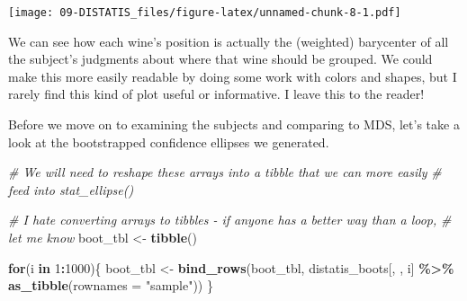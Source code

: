 \documentclass[
]{book}
\newenvironment{Shaded}{\begin{snugshade}}{\end{snugshade}}
\newcommand{\AttributeTok}[1]{\textcolor[rgb]{0.13,0.29,0.53}{#1}}
\newcommand{\CommentTok}[1]{\textcolor[rgb]{0.56,0.35,0.01}{\textit{#1}}}
\newcommand{\ControlFlowTok}[1]{\textcolor[rgb]{0.13,0.29,0.53}{\textbf{#1}}}
\newcommand{\DecValTok}[1]{\textcolor[rgb]{0.00,0.00,0.81}{#1}}
\newcommand{\FunctionTok}[1]{\textcolor[rgb]{0.13,0.29,0.53}{\textbf{#1}}}
\newcommand{\NormalTok}[1]{#1}
\newcommand{\OtherTok}[1]{\textcolor[rgb]{0.56,0.35,0.01}{#1}}
\newcommand{\SpecialCharTok}[1]{\textcolor[rgb]{0.81,0.36,0.00}{\textbf{#1}}}
\newcommand{\StringTok}[1]{\textcolor[rgb]{0.31,0.60,0.02}{#1}}
\begin{document}
\texttt{[image: 09-DISTATIS\_files/figure-latex/unnamed-chunk-8-1.pdf]}

We can see how each wine's position is actually the (weighted) barycenter of all the subject's judgments about where that wine should be grouped. We could make this more easily readable by doing some work with colors and shapes, but I rarely find this kind of plot useful or informative. I leave this to the reader!

Before we move on to examining the subjects and comparing to MDS, let's take a look at the bootstrapped confidence ellipses we generated.

\begin{Shaded}
\begin{Highlighting}[]
\CommentTok{\# We will need to reshape these arrays into a tibble that we can more easily}
\CommentTok{\# feed into \textasciigrave{}stat\_ellipse()\textasciigrave{}}

\CommentTok{\# I hate converting arrays to tibbles {-} if anyone has a better way than a loop,}
\CommentTok{\# let me know}
\NormalTok{boot\_tbl }\OtherTok{\textless{}{-}} \FunctionTok{tibble}\NormalTok{()}

\ControlFlowTok{for}\NormalTok{(i }\ControlFlowTok{in} \DecValTok{1}\SpecialCharTok{:}\DecValTok{1000}\NormalTok{)\{}
\NormalTok{  boot\_tbl }\OtherTok{\textless{}{-}} 
    \FunctionTok{bind\_rows}\NormalTok{(boot\_tbl,}
\NormalTok{              distatis\_boots[, , i] }\SpecialCharTok{\%\textgreater{}\%}
                \FunctionTok{as\_tibble}\NormalTok{(}\AttributeTok{rownames =} \StringTok{"sample"}\NormalTok{))}
\NormalTok{\}}


\end{Highlighting}
\end{Shaded}
\end{document}
